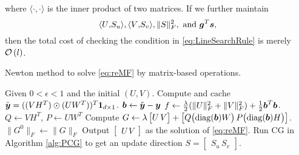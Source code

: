 where $\langle\cdot{,}\cdot\rangle$ is the inner product of two matrices.
If we further maintain
\begin{equation}    
    \langle{U}{,}{S_u}\rangle,\langle{V}{,}{S_v}\rangle,\|S\|_F^2,\text{ and } {\ensuremath{\boldsymbol{g}}}^T{\boldsymbol{s}},
    \label{eq:LsRequire1}
\end{equation}
then the total cost of checking the condition in \eqref{eq:LineSearchRule} is merely $\mathcal{O}\left(l\right)$.
\begin{algorithm}[t]
    \caption{Newton method to solve \eqref{eq:reMF} by matrix-based operations.}
    \label{alg:LrFramework}
    \begin{algorithmic}[1]
        \State Given $0< \epsilon < 1$ and the initial $(U,V)$.        
        \State Compute and cache $\tilde{\boldsymbol{y}} = ((VH^T) \odot (UW^T))^T\boldsymbol{1}_{d\times 1}$.
        \State $\boldsymbol{b} \leftarrow \tilde{\boldsymbol{y}} - \boldsymbol{y} $
        \State $f \gets \frac{\lambda}{2}(\|U\|_F^2 + \|V\|_F^2) + \frac{1}{2}\boldsymbol{b}^T \boldsymbol{b}$.
            \State $Q \gets VH^T$, $P \gets UW^T$
            \State Compute $G \gets \lambda \begin{bmatrix} U \, V \end{bmatrix} + \begin{bmatrix} Q \bigl(\operatorname*{diag}(\boldsymbol{b}) W \bigr) \, P \bigl ( \operatorname*{diag}(\boldsymbol{b}) H \bigr) \end{bmatrix}$.\label{alg:LrFramework:compG}
                \State $\|G^0\|_F \gets \|G\|_F$
            \EndIf
                \State Output $\begin{bmatrix} U \, V \end{bmatrix}$ as the solution of \eqref{eq:reMF}.
            \EndIf
            \State Run CG in Algorithm \ref{alg:PCG} to get an update direction $S =  \begin{bmatrix} S_u \, S_v \end{bmatrix}$.

\end{algorithmic}
\end{algorithm}
